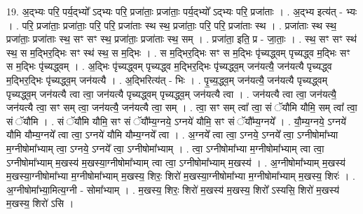 \documentclass[17pt]{extarticle}
\begin{document}
19. अ॒द्भ्यः परि॒ पर्य॒द्भ्यो᳚ ऽद्भ्यः परि॒ प्रजा॑ताः॒ प्रजा॑ताः॒ पर्य॒द्भ्यो᳚ ऽद्भ्यः परि॒ प्रजा॑ताः । . अ॒द्भ्य इत्य॑त् - भ्यः । . परि॒ प्रजा॑ताः॒ प्रजा॑ताः॒ परि॒ परि॒ प्रजा॑ताः स्थ स्थ॒ प्रजा॑ताः॒ परि॒ परि॒ प्रजा॑ताः स्थ । . प्रजा॑ताः स्थ स्थ॒ प्रजा॑ताः॒ प्रजा॑ताः स्थ॒ सꣳ सꣳ स्थ॒ प्रजा॑ताः॒ प्रजा॑ताः स्थ॒ सम् । . प्रजा॑ता॒ इति॒ प्र - जा॒ताः॒ । . स्थ॒ सꣳ सꣳ स्थ॑ स्थ॒ स म॒द्भिर॒द्भिः सꣳ स्थ॑ स्थ॒ स म॒द्भिः । . स म॒द्भिर॒द्भिः सꣳ स म॒द्भिः पृ॑च्यद्ध्वम् पृच्यद्ध्व म॒द्भिः सꣳ स म॒द्भिः पृ॑च्यद्ध्वम् । . अ॒द्भिः पृ॑च्यद्ध्वम् पृच्यद्ध्व म॒द्भिर॒द्भिः पृ॑च्यद्ध्व॒म् जन॑यत्यै॒ जन॑यत्यै पृच्यद्ध्व म॒द्भिर॒द्भिः पृ॑च्यद्ध्व॒म् जन॑यत्यै । . अ॒द्भिरित्य॑त् - भिः । . पृ॒च्य॒द्ध्व॒म् जन॑यत्यै॒ जन॑यत्यै पृच्यद्ध्वम् पृच्यद्ध्व॒म् जन॑यत्यै त्वा त्वा॒ जन॑यत्यै पृच्यद्ध्वम् पृच्यद्ध्व॒म् जन॑यत्यै त्वा । . जन॑यत्यै त्वा त्वा॒ जन॑यत्यै॒ जन॑यत्यै त्वा॒ सꣳ सम् त्वा॒ जन॑यत्यै॒ जन॑यत्यै त्वा॒ सम् । . त्वा॒ सꣳ सम् त्वा᳚ त्वा॒ सं ॅयौ॑मि यौमि॒ सम् त्वा᳚ त्वा॒ सं ॅयौ॑मि । . सं ॅयौ॑मि यौमि॒ सꣳ सं ॅयौ᳚म्य॒ग्नये॒ ऽग्नये॑ यौमि॒ सꣳ सं ॅयौ᳚म्य॒ग्नये᳚ । . यौ॒म्य॒ग्नये॒ ऽग्नये॑ यौमि यौम्य॒ग्नये᳚ त्वा त्वा॒ ऽग्नये॑ यौमि यौम्य॒ग्नये᳚ त्वा । . अ॒ग्नये᳚ त्वा त्वा॒ ऽग्नये॒ ऽग्नये᳚ त्वा॒ ऽग्नीषोमा᳚भ्या म॒ग्नीषोमा᳚भ्याम् त्वा॒ ऽग्नये॒ ऽग्नये᳚ त्वा॒ ऽग्नीषोमा᳚भ्याम् । . त्वा॒ ऽग्नीषोमा᳚भ्या म॒ग्नीषोमा᳚भ्याम् त्वा त्वा॒ ऽग्नीषोमा᳚भ्याम् म॒खस्य॑ म॒खस्या॒ग्नीषोमा᳚भ्याम् त्वा त्वा॒ ऽग्नीषोमा᳚भ्याम् म॒खस्य॑ । . अ॒ग्नीषोमा᳚भ्याम् म॒खस्य॑ म॒खस्या॒ग्नीषोमा᳚भ्या म॒ग्नीषोमा᳚भ्याम् म॒खस्य॒ शिरः॒ शिरो॑ म॒खस्या॒ग्नीषोमा᳚भ्या म॒ग्नीषोमा᳚भ्याम् म॒खस्य॒ शिरः॑ । . अ॒ग्नीषोमा᳚भ्या॒मित्य॒ग्नी - सोमा᳚भ्याम् । . म॒खस्य॒ शिरः॒ शिरो॑ म॒खस्य॑ म॒खस्य॒ शिरो᳚ ऽस्यसि॒ शिरो॑ म॒खस्य॑ म॒खस्य॒ शिरो॑ ऽसि । \newline
\end{document}
